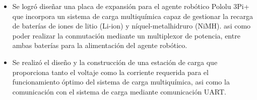 
\begin{itemize}
    
    \item Se logró diseñar una placa de expansión para el agente robótico
    Pololu 3Pi+ que incorpora un sistema de carga multiquímica capaz de
    gestionar la recarga de baterías de iones de litio (Li-ion) y níquel-metalhidruro (NiMH).
    asi como poder realizar la conmutación mediante un multiplexor de 
    potencia, entre ambas baterías para la 
    alimentación del agente robótico.

    \item Se realizó el diseño y la construcción de una estación de carga
    que proporciona tanto el voltaje como la corriente requerida para el
    funcionamiento óptimo del sistema de carga multiquímica, asi como la
    comunicación con el sistema de carga mediante comunicación UART.


\end{itemize}